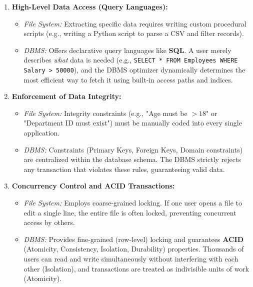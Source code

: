 \documentclass[12pt,a3paper]{article}
\begin{document}
\begin{enumerate}
\begin{tcolorbox}[enhanced,breakable,ansbox,colback=cA!4,colframe=cA,boxrule=0.8pt,arc=5pt,title={\textbf{Answer}},fonttitle=\bfseries\color{white},colbacktitle=cA]
\begin{enumerate}
    \item \textbf{High-Level Data Access (Query Languages):}
    \begin{itemize}
        \item \textit{File System:} Extracting specific data requires writing custom procedural scripts (e.g., writing a Python script to parse a CSV and filter records).
        \item \textit{DBMS:} Offers declarative query languages like \textbf{SQL}. A user merely describes \textit{what} data is needed (e.g., \texttt{SELECT * FROM Employees WHERE Salary > 50000}), and the DBMS optimizer dynamically determines the most efficient way to fetch it using built-in access paths and indices.
    \end{itemize}
    \vspace{0.5em}

    \item \textbf{Enforcement of Data Integrity:}
    \begin{itemize}
        \item \textit{File System:} Integrity constraints (e.g., "Age must be $>18$" or "Department ID must exist") must be manually coded into every single application.
        \item \textit{DBMS:} Constraints (Primary Keys, Foreign Keys, Domain constraints) are centralized within the database schema. The DBMS strictly rejects any transaction that violates these rules, guaranteeing valid data.
    \end{itemize}
    \vspace{0.5em}

    \item \textbf{Concurrency Control and ACID Transactions:}
    \begin{itemize}
        \item \textit{File System:} Employs coarse-grained locking. If one user opens a file to edit a single line, the entire file is often locked, preventing concurrent access by others.
        \item \textit{DBMS:} Provides fine-grained (row-level) locking and guarantees \textbf{ACID} (Atomicity, Consistency, Isolation, Durability) properties. Thousands of users can read and write simultaneously without interfering with each other (Isolation), and transactions are treated as indivisible units of work (Atomicity).
    \end{itemize}
    \vspace{0.5em}


\end{enumerate}
\end{tcolorbox}
\end{enumerate}
\end{document}

